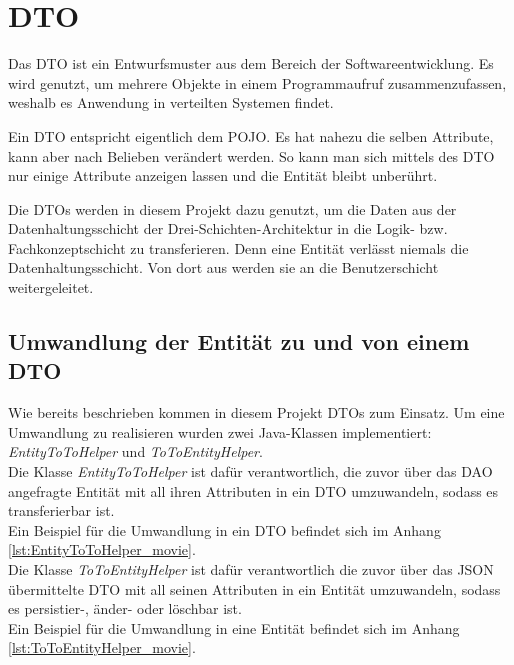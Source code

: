 \section{\acf{DTO}}
\label{sec:dto}
\authorsection{\authorSG}

Das \ac{DTO} ist ein Entwurfsmuster aus dem Bereich der Softwareentwicklung.
Es wird genutzt, um mehrere Objekte in einem Programmaufruf zusammenzufassen, weshalb es Anwendung in verteilten Systemen findet.

Ein \ac{DTO} entspricht eigentlich dem \ac{POJO}.
Es hat nahezu die selben Attribute, kann aber nach Belieben verändert werden.
So kann man sich mittels des \ac{DTO} nur einige Attribute anzeigen lassen und die Entität bleibt unberührt.

Die \acsp{DTO} werden in diesem Projekt dazu genutzt, um die Daten aus der Datenhaltungsschicht der Drei-Schichten-Architektur in die Logik- bzw. Fachkonzeptschicht zu transferieren. Denn eine Entität verlässt niemals die Datenhaltungsschicht.
Von dort aus werden sie an die Benutzerschicht weitergeleitet.

\subsection{Umwandlung der Entität zu und von einem \acf{DTO}}
\label{ssec:umwandlung_dto}
\authorsection{\authorSG}

Wie bereits beschrieben kommen in diesem Projekt \acp{DTO} zum Einsatz. Um eine Umwandlung zu realisieren wurden zwei Java-Klassen implementiert: \textit{EntityToToHelper} und \textit{ToToEntityHelper}. \\

Die Klasse \textit{EntityToToHelper} ist dafür verantwortlich, die zuvor über das \acs{DAO} angefragte Entität mit all ihren Attributen in ein \acs{DTO} umzuwandeln, sodass es transferierbar ist. \\
Ein Beispiel für die Umwandlung in ein \acs{DTO} befindet sich im Anhang \vref{lst:EntityToToHelper_movie}. \\
Die Klasse \textit{ToToEntityHelper} ist dafür verantwortlich die zuvor über das \acs{JSON} übermittelte \acs{DTO} mit all seinen Attributen in ein Entität umzuwandeln, sodass es persistier-, änder- oder löschbar ist.\\ 
Ein Beispiel für die Umwandlung in eine Entität befindet sich im Anhang \vref{lst:ToToEntityHelper_movie}.
